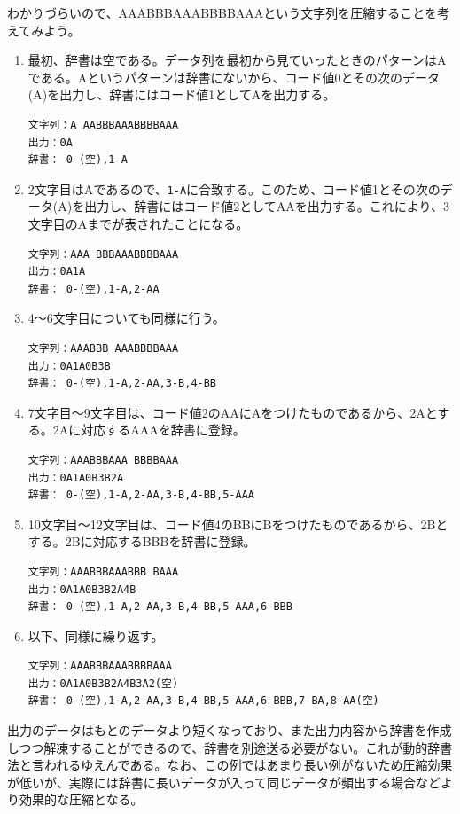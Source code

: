 わかりづらいので、AAABBBAAABBBBAAAという文字列を圧縮することを考えてみよう。
\begin{enumerate}
\item 最初、辞書は空である。データ列を最初から見ていったときのパターンはAである。Aというパターンは辞書にないから、コード値0とその次のデータ(A)を出力し、辞書にはコード値1としてAを出力する。
\begin{verbatim}
文字列：A AABBBAAABBBBAAA
出力：0A
辞書： 0-(空),1-A
\end{verbatim}
\item 2文字目はAであるので、\verb|1-A|に合致する。このため、コード値1とその次のデータ(A)を出力し、辞書にはコード値2としてAAを出力する。これにより、3文字目のAまでが表されたことになる。
\begin{verbatim}
文字列：AAA BBBAAABBBBAAA
出力：0A1A
辞書： 0-(空),1-A,2-AA
\end{verbatim}
\item 4〜6文字目についても同様に行う。
\begin{verbatim}
文字列：AAABBB AAABBBBAAA
出力：0A1A0B3B
辞書： 0-(空),1-A,2-AA,3-B,4-BB
\end{verbatim}
\item 7文字目〜9文字目は、コード値2のAAにAをつけたものであるから、2Aとする。2Aに対応するAAAを辞書に登録。
\begin{verbatim}
文字列：AAABBBAAA BBBBAAA
出力：0A1A0B3B2A
辞書： 0-(空),1-A,2-AA,3-B,4-BB,5-AAA
\end{verbatim}
\item 10文字目〜12文字目は、コード値4のBBにBをつけたものであるから、2Bとする。2Bに対応するBBBを辞書に登録。
\begin{verbatim}
文字列：AAABBBAAABBB BAAA
出力：0A1A0B3B2A4B
辞書： 0-(空),1-A,2-AA,3-B,4-BB,5-AAA,6-BBB
\end{verbatim}
\item 以下、同様に繰り返す。
\begin{verbatim}
文字列：AAABBBAAABBBBAAA
出力：0A1A0B3B2A4B3A2(空)
辞書： 0-(空),1-A,2-AA,3-B,4-BB,5-AAA,6-BBB,7-BA,8-AA(空)
\end{verbatim}
\end{enumerate}

出力のデータはもとのデータより短くなっており、また出力内容から辞書を作成しつつ解凍することができるので、辞書を別途送る必要がない。これが動的辞書法と言われるゆえんである。なお、この例ではあまり長い例がないため圧縮効果が低いが、実際には辞書に長いデータが入って同じデータが頻出する場合などより効果的な圧縮となる。

